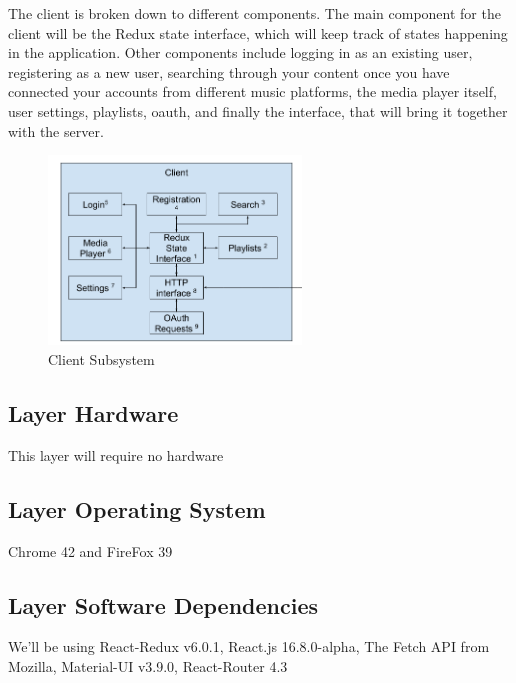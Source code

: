 The client is broken down to different components. The main component for the client will be the Redux state interface, which will keep track of states happening in the application. Other components include logging in as an existing user, registering as a new user, searching through your content once you have connected your accounts from different music platforms, the media player itself, user settings, playlists, oauth, and finally the interface, that will bring it together with the server.

\begin{figure}[h!]
	\centering
 	\includegraphics[width=0.60\textwidth]{images/client/ADS-SDS-Client.png}
 	\caption{Client Subsystem}
\end{figure}


\subsection{Layer Hardware}
This layer will require no hardware

\subsection{Layer Operating System}
Chrome 42 and FireFox 39

\subsection{Layer Software Dependencies}
We'll be using React-Redux v6.0.1,  React.js 16.8.0-alpha, The Fetch API from Mozilla, Material-UI v3.9.0, React-Router 4.3

\newpage
